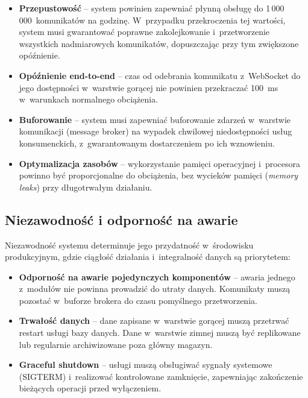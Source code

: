 \begin{itemize}
    \item \textbf{Przepustowość} -- system powinien zapewniać płynną obsługę do 1\,000\,000~komunikatów na godzinę.
    W~przypadku przekroczenia tej wartości, system musi gwarantować poprawne zakolejkowanie i~przetworzenie wszystkich
    nadmiarowych komunikatów, dopuszczając przy tym zwiększone opóźnienie.
    \item \textbf{Opóźnienie end-to-end} -- czas od odebrania komunikatu z~WebSocket do jego dostępności w~warstwie
    gorącej nie powinien przekraczać 100~ms w~warunkach normalnego obciążenia.
    \item \textbf{Buforowanie} -- system musi zapewniać buforowanie zdarzeń w~warstwie komunikacji (message broker)
    na wypadek chwilowej niedostępności usług konsumenckich, z~gwarantowanym dostarczeniem po ich wznowieniu.
    \item \textbf{Optymalizacja zasobów} -- wykorzystanie pamięci operacyjnej i~procesora powinno być proporcjonalne
    do obciążenia, bez wycieków pamięci (\textit{memory leaks}) przy długotrwałym działaniu.
\end{itemize}

\subsection{Niezawodność i odporność na awarie}
\label{subsec:niezawodnosc}

Niezawodność systemu determinuje jego przydatność w~środowisku produkcyjnym, gdzie ciągłość działania i~integralność
danych są priorytetem:

\begin{itemize}
    \item \textbf{Odporność na awarie pojedynczych komponentów} -- awaria jednego z~modułów nie powinna prowadzić do
    utraty danych.
    Komunikaty muszą pozostać w~buforze brokera do czasu pomyślnego przetworzenia.
    \item \textbf{Trwałość danych} -- dane zapisane w~warstwie gorącej muszą przetrwać restart usługi bazy danych.
    Dane w~warstwie zimnej muszą być replikowane lub regularnie archiwizowane poza główny magazyn.
    \item \textbf{Graceful shutdown} -- usługi muszą obsługiwać sygnały systemowe (SIGTERM) i~realizować kontrolowane
    zamknięcie, zapewniając zakończenie bieżących operacji przed wyłączeniem.
\end{itemize}


